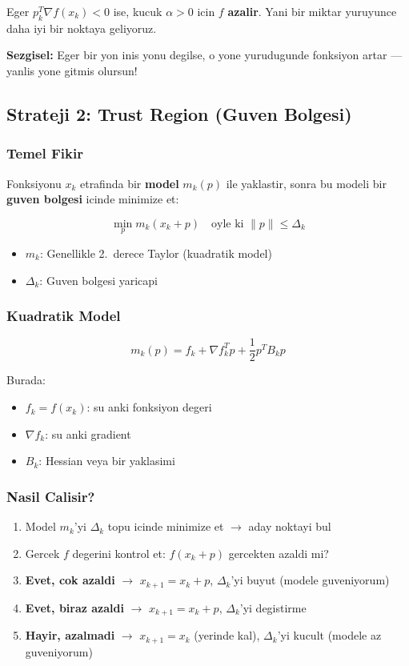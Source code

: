 \documentclass[12pt,a4paper]{article}
\theoremstyle{definition}
\theoremstyle{remark}
\begin{document}
Eger $p_k^T \nabla f(x_k) < 0$ ise, kucuk $\alpha > 0$ icin $f$ \textbf{azalir}. Yani bir miktar yuruyunce daha iyi bir noktaya geliyoruz.

\textbf{Sezgisel:} Eger bir yon inis yonu degilse, o yone yurudugunde fonksiyon artar --- yanlis yone gitmis olursun!

\subsection{Strateji 2: Trust Region (Guven Bolgesi)}

\subsubsection{Temel Fikir}

Fonksiyonu $x_k$ etrafinda bir \textbf{model} $m_k(p)$ ile yaklastir, sonra bu modeli bir \textbf{guven bolgesi} icinde minimize et:

\[
\min_p m_k(x_k + p) \quad \text{oyle ki } \|p\| \leq \Delta_k
\]

\begin{itemize}[leftmargin=*, itemsep=0.2em]
\item $m_k$: Genellikle 2.\ derece Taylor (kuadratik model)
\item $\Delta_k$: Guven bolgesi yaricapi
\end{itemize}

\subsubsection{Kuadratik Model}

\[
m_k(p) = f_k + \nabla f_k^T p + \frac{1}{2} p^T B_k p
\]

Burada:
\begin{itemize}[leftmargin=*, itemsep=0.2em]
\item $f_k = f(x_k)$: su anki fonksiyon degeri
\item $\nabla f_k$: su anki gradient
\item $B_k$: Hessian veya bir yaklasimi
\end{itemize}

\subsubsection{Nasil Calisir?}

\begin{enumerate}[leftmargin=*, itemsep=0.3em]
\item Model $m_k$'yi $\Delta_k$ topu icinde minimize et $\rightarrow$ aday noktayi bul
\item Gercek $f$ degerini kontrol et: $f(x_k + p)$ gercekten azaldi mi?
\item \textbf{Evet, cok azaldi} $\rightarrow$ $x_{k+1} = x_k + p$, $\Delta_k$'yi buyut (modele guveniyorum)
\item \textbf{Evet, biraz azaldi} $\rightarrow$ $x_{k+1} = x_k + p$, $\Delta_k$'yi degistirme
\item \textbf{Hayir, azalmadi} $\rightarrow$ $x_{k+1} = x_k$ (yerinde kal), $\Delta_k$'yi kucult (modele az guveniyorum)
\end{enumerate}
\end{document}

